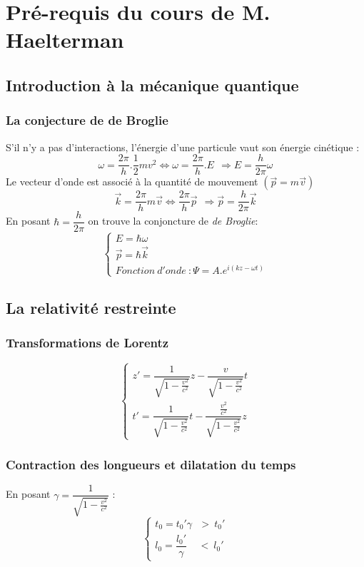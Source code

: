 \documentclass	[11pt, a4paper, openany]{book}
\begin{document}
	\chapter*{Pré-requis du cours de M. Haelterman}
	\section*{Introduction à la mécanique quantique}
	\subsection*{La conjecture de de Broglie}
	S'il n'y a pas d'interactions, l'énergie d'une particule vaut son énergie cinétique :
	$$\omega = \frac{2\pi}{h}.\frac{1}{2}mv^2 \Leftrightarrow \omega = \frac{2\pi}{h}.E\ \ \Rightarrow E = \frac{h}{2\pi}\omega$$
	Le vecteur d'onde est associé à la quantité de mouvement $(\vec{p} = m\vec v)$
	$$\vec{k} = \frac{2\pi}{h}m\vec{v} \Leftrightarrow \frac{2\pi}{h}\vec{p} \ \ \Rightarrow \vec{p} = \frac{h}{2\pi}\vec{k}$$
	En posant $\hbar = \dfrac{h}{2\pi}$ on trouve la conjoncture de \textit{de Broglie}:
	$$\left\{\begin{array}{l}
	E = \hbar \omega\\
	\vec{p} =  \hbar \vec{k}\\
	Fonction\ d'onde\ : \Psi = A.e^{i(kz - \omega t)}
	\end{array}\right.$$
	
	\section*{La relativité restreinte}
	\subsection*{Transformations de Lorentz}
	$$\left\{\begin{array}{l}
	z' = \dfrac{1}{\sqrt{1 - \frac{v^2}{c^2}}}z - \dfrac{v}{\sqrt{1 - \frac{v^2}{c^2}}}t\\
	t' = \dfrac{1}{\sqrt{1 - \frac{v^2}{c^2}}}t - \dfrac{\frac{v^2}{c^2}}{\sqrt{1 - \frac{v^2}{c^2}}}z
	\end{array}\right.$$
	
	\subsection*{Contraction des longueurs et dilatation du temps}
	En posant $\gamma = \dfrac{1}{\sqrt{1 - \frac{v^2}{c^2}}}$ :
	$$\left\{\begin{array}{l}
	t_0 = t_0' \gamma\ \ \ >\ t_0'\\
	l_0 = \dfrac{l_0'}{\gamma}\ \ \ \ \ <\ l_0'
	\end{array}\right.$$
	
\end{document}
